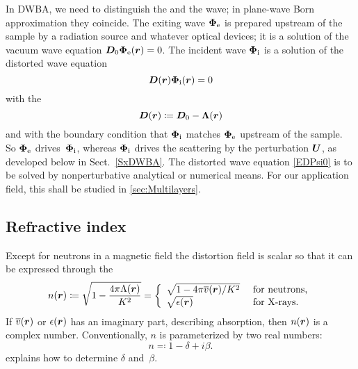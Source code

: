 In DWBA, we need to distinguish the  and the  wave;
in plane-wave Born approximation they coincide.
The exiting wave $\bm{\Phi}_\text{e}$ is prepared upstream of the sample by
a radiation source and whatever optical devices;
it is a solution of the vacuum wave equation $\bm{D}_0\bm{\Phi}_\text{e}(\bm{r})=0$.
The incident wave $\bm{\Phi}_{\text{i}}$ is a solution of the
distorted wave equation
%
%
%
\begin{equation}\label{EDPsi0}
  \TD(\r)\v\Phi_\si(\r) = 0
\end{equation}
with
the 
%
%
%
\begin{equation}\label{EdefD}
  \TD(\r) \coloneqq \TDo - \TL(\r)
\end{equation}
and with the boundary condition that $\bm{\Phi}_{\text{i}}$
matches $\bm{\Phi}_\text{e}$ upstream of the sample.
So $\bm{\Phi}_\text{e}$ drives~$\bm{\Phi}_{\text{i}}$,
whereas $\bm{\Phi}_{\text{i}}$ drives the scattering by the perturbation $\bm{U}$,
as developed below in Sect.~\ref{SxDWBA}.
The distorted wave equation \cref{EDPsi0}
is to be solved by nonperturbative analytical or numerical means.
For our application field, this shall be studied in \cref{sec:Multilayers}.

\subsection{Refractive index}\label{Sri1}

Except for neutrons in a magnetic field
the distortion field is scalar so
that it can be expressed through the 
%
%
%
\begin{equation}\label{EnkK}
  n(\r)
  \coloneqq\sqrt{1-\frac{4\pi\Lambda(\r)}{K^2}}
  = \left\{\begin{array}{ll}
       \sqrt{1-4\pi\mv(\r)/K^2} &\text{ for neutrons,}\\
       \sqrt{\epsilon(\r)} &\text{ for X-rays.}
    \end{array}\right.
\end{equation}
If $\overline{v}(\bm{r})$ or $\epsilon(\bm{r})$ has an imaginary part, describing absorption,
%
then $n(\bm{r})$ is a complex number.
Conventionally, $n$ is parameterized by two real numbers:
\begin{equation}\label{Endb1}
  n \eqqcolon  1-\delta +i\beta.
\end{equation}
%
%
 explains how to determine $\delta$ and~$\beta$.

